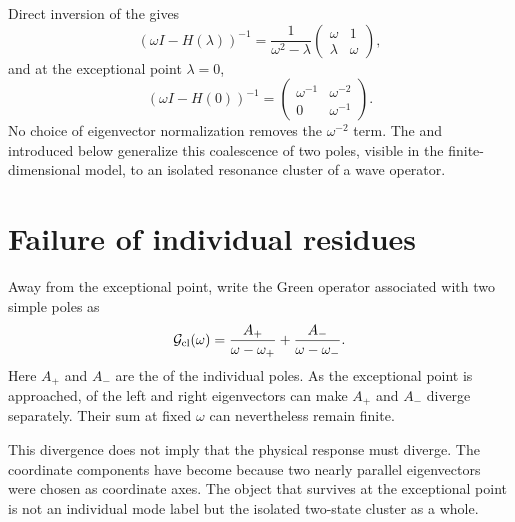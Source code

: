 Direct inversion of the  gives
\begin{equation}
\left(\omega I-H(\lambda)\right)^{-1}
=
\frac{1}{\omega^2-\lambda}
\begin{pmatrix}
\omega&1\\
\lambda&\omega
\end{pmatrix},
\label{eq:ep-two-by-two-resolvent}
\end{equation}
and at the exceptional point $\lambda=0$,
\begin{equation}
\left(\omega I-H(0)\right)^{-1}
=
\begin{pmatrix}
\omega^{-1}&\omega^{-2}\\
0&\omega^{-1}
\end{pmatrix}.
\label{eq:ep-two-by-two-double-pole}
\end{equation}
No choice of eigenvector normalization removes the $\omega^{-2}$ term. The  and  introduced below generalize this coalescence of two poles, visible in the finite-dimensional model, to an isolated resonance cluster of a wave operator.

\section{Failure of individual residues}

Away from the exceptional point, write the Green operator associated with two simple poles as
\begin{equation}
\mathcal{G}_{\mathrm{cl}}(\omega)
=
\frac{A_+}{\omega-\omega_+}
+\frac{A_-}{\omega-\omega_-}.
\label{eq:two-simple-poles}
\end{equation}
Here $A_+$ and $A_-$ are the  of the individual poles. As the exceptional point is approached,  of the left and right eigenvectors can make $A_+$ and $A_-$ diverge separately. Their sum at fixed $\omega$ can nevertheless remain finite.

This divergence does not imply that the physical response must diverge. The coordinate components have become  because two nearly parallel eigenvectors were chosen as coordinate axes. The object that survives at the exceptional point is not an individual mode label but the isolated two-state cluster as a whole.

\section{}

